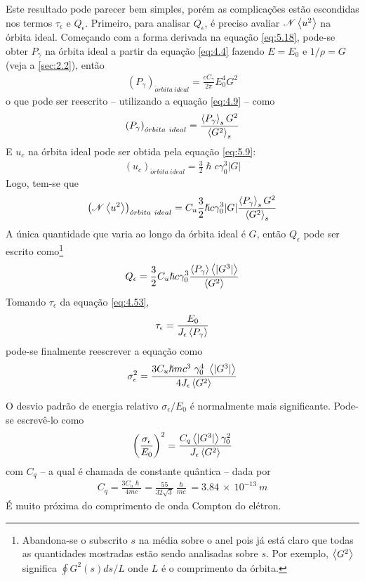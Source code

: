 Este resultado pode parecer bem simples, porém as complicações estão escondidas nos termos $\tau_\epsilon$ e $Q_\epsilon$. Primeiro, para analisar $Q_\epsilon$, é preciso avaliar $\mathscr{N}\left< u^2 \right>$ na órbita ideal. Começando com a forma derivada na equação \eqref{eq:5.18}, pode-se obter $P_\gamma$ na órbita ideal a partir da equação \eqref{eq:4.4} fazendo $E=E_0$ e $1/\rho = G$ (veja a \autoref{sec:2.2}), então
\begin{align}
	\left(P_\gamma\right)_{\acute{o}rbita\ ideal} = \frac{c C_\gamma}{2\pi}E_0^4G^2
\end{align}
o que pode ser reescrito -- utilizando a equação \eqref{eq:4.9} -- como
\begin{align}
	\left(P_\gamma\right)_{\acute{o}rbita\ ideal} = \frac{\left< P_\gamma \right>_s G^2}{\left< G^2 \right>_s}
\end{align}
E $u_c$ na órbita ideal pode ser obtida pela equação \eqref{eq:5.9}:
\begin{align}
	\left(u_c\right)_{\acute{o}rbita\ ideal} = \frac{3}{2}\hslash c \gamma_0^3 |G|\label{eq:5.40}
\end{align}
Logo, tem-se que
\begin{align}
	\left(\mathscr{N}\left< u^2 \right>\right)_{\acute{o}rbita\ ideal} = C_u \frac{3}{2}\hslash c \gamma_0^3 |G| \frac{\left< P_\gamma \right>_s G^2}{\left< G^2 \right>_s}\label{eq:5.41}
\end{align}
A única quantidade que varia ao longo da órbita ideal é $G$, então $Q_\epsilon$ pode ser escrito como\footnote{Abandona-se o subscrito $s$ na média sobre o anel pois já está claro que todas as quantidades mostradas estão sendo analisadas sobre $s$. Por exemplo, $\left< G^2 \right>$ significa $\oint G^2(s)ds/ L$ onde $L$ é o comprimento da órbita.}
\begin{align}
	Q_\epsilon = \frac{3}{2}C_u\hslash c \gamma_0^3 \frac{\left< P_\gamma \right> \left< |G^3| \right>}{\left< G^2 \right>}
\end{align}
Tomando $\tau_\epsilon$ da equação \eqref{eq:4.53},
\begin{align}
	\tau_\epsilon = \frac{E_0}{J_\epsilon\left< P_\gamma \right>}
\end{align}
pode-se finalmente reescrever a equação como
\begin{align}
	\sigma_\epsilon^2 = \frac{3 C_u \hslash m c^3\ \gamma_0^4\ \mean{|G^3|}}{4 J_\epsilon \mean{G^2}}
\end{align}

O desvio padrão de energia relativo $\sigma_\epsilon/E_0$ é normalmente mais significante. Pode-se escrevê-lo como
\begin{align}
	\left(\frac{\sigma_\epsilon}{E_0}\right)^2 = \frac{C_q \left< |G^3| \right> \gamma_0^2}{J_\epsilon \left< G^2 \right>}\label{eq:5.45}
\end{align}
com $C_q$ -- a qual é chamada de constante quântica -- dada por
\begin{align}
	C_q = \frac{3C_u\hslash}{4mc} = \frac{55}{32\sqrt{3}}\frac{\hslash}{mc} = 3.84\ \times\ 10^{-13}\ m\label{eq:5.46}
\end{align}
É muito próxima do comprimento de onda Compton do elétron.

